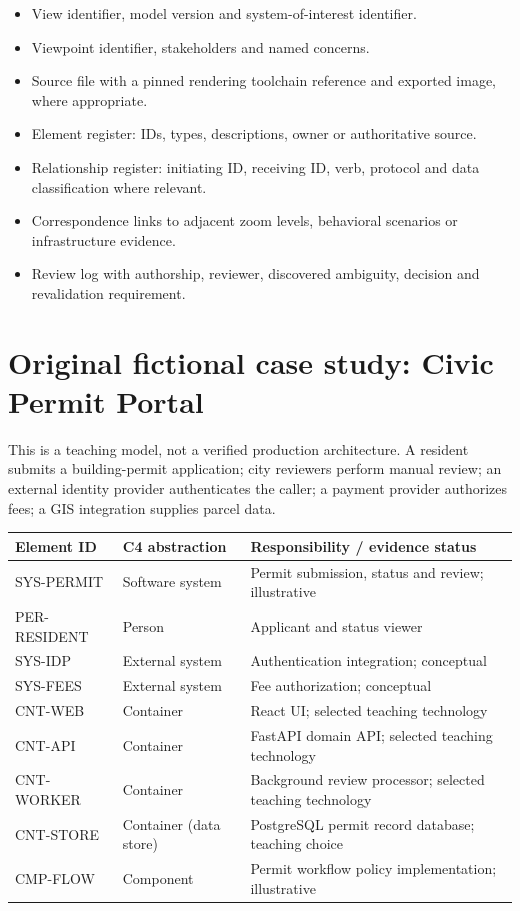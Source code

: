 \documentclass[10pt,letterpaper]{article}
\begin{document}
\begin{itemize}
\item View identifier, model version and system-of-interest identifier.
\item Viewpoint identifier, stakeholders and named concerns.
\item Source file with a pinned rendering toolchain reference and exported image, where appropriate.
\item Element register: IDs, types, descriptions, owner or authoritative source.
\item Relationship register: initiating ID, receiving ID, verb, protocol and data classification where relevant.
\item Correspondence links to adjacent zoom levels, behavioral scenarios or infrastructure evidence.
\item Review log with authorship, reviewer, discovered ambiguity, decision and revalidation requirement.
\end{itemize}
\section{Original fictional case study: Civic Permit Portal}
This is a teaching model, not a verified production architecture. A resident submits a building-permit application; city reviewers perform manual review; an external identity provider authenticates the caller; a payment provider authorizes fees; a GIS integration supplies parcel data.

\begin{tabularx}{\linewidth}{@{}YYY@{}}\toprule
\textbf{Element ID} & \textbf{C4 abstraction} & \textbf{Responsibility / evidence status} \\ \midrule
SYS-PERMIT & Software system & Permit submission, status and review; illustrative \\
PER-RESIDENT & Person & Applicant and status viewer \\
SYS-IDP & External system & Authentication integration; conceptual \\
SYS-FEES & External system & Fee authorization; conceptual \\
CNT-WEB & Container & React UI; selected teaching technology \\
CNT-API & Container & FastAPI domain API; selected teaching technology \\
CNT-WORKER & Container & Background review processor; selected teaching technology \\
CNT-STORE & Container (data store) & PostgreSQL permit record database; teaching choice \\
CMP-FLOW & Component & Permit workflow policy implementation; illustrative \\
\bottomrule\end{tabularx}
\end{document}
